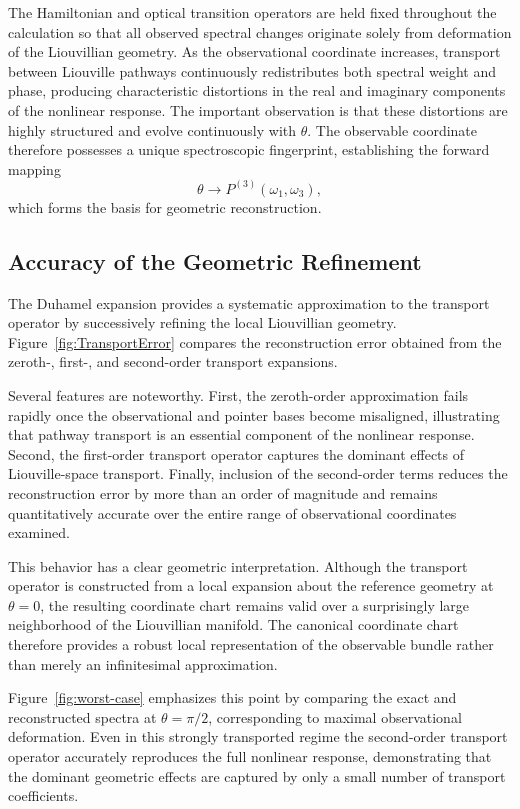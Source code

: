 The Hamiltonian and optical transition operators are held fixed
throughout the calculation so that all observed spectral changes
originate solely from deformation of the Liouvillian geometry.
As the observational coordinate increases, transport between
Liouville pathways continuously redistributes both spectral
weight and phase, producing characteristic distortions in the
real and imaginary components of the nonlinear response.
The important observation is that these distortions are highly
structured and evolve continuously with $\theta$. The observable
coordinate therefore possesses a unique spectroscopic
fingerprint, establishing the forward mapping
\[
\theta
\longrightarrow
P^{(3)}(\omega_1,\omega_3),
\]
which forms the basis for geometric reconstruction.

\subsection{Accuracy of the Geometric Refinement}
The Duhamel expansion provides a systematic approximation to the
transport operator by successively refining the local
Liouvillian geometry. Figure~\ref{fig:TransportError} compares
the reconstruction error obtained from the zeroth-, first-, and
second-order transport expansions.



Several features are noteworthy. First, the zeroth-order
approximation fails rapidly once the observational and pointer
bases become misaligned, illustrating that pathway transport is
an essential component of the nonlinear response. Second, the
first-order transport operator captures the dominant effects of
Liouville-space transport. Finally, inclusion of the second-order
terms reduces the reconstruction error by more than an order of
magnitude and remains quantitatively accurate over the entire
range of observational coordinates examined.

This behavior has a clear geometric interpretation. Although the
transport operator is constructed from a local expansion about
the reference geometry at $\theta=0$, the resulting coordinate
chart remains valid over a surprisingly large neighborhood of
the Liouvillian manifold. The canonical coordinate chart
therefore provides a robust local representation of the
observable bundle rather than merely an infinitesimal
approximation.



Figure~\ref{fig:worst-case} emphasizes this point by comparing
the exact and reconstructed spectra at
$\theta=\pi/2$, corresponding to maximal observational
deformation. Even in this strongly transported regime the
second-order transport operator accurately reproduces the full
nonlinear response, demonstrating that the dominant geometric
effects are captured by only a small number of transport
coefficients.

